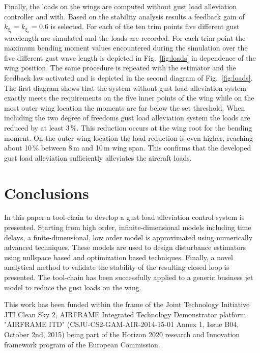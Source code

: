 \documentclass[graybox]{svmult}
\begin{document}
Finally, the loads on the wings are computed without gust load alleviation controller and with.  Based on the stability analysis results a feedback gain of $k_{\xi_i}=k_{\xi_o}=0.6$ is selected. For each of the ten trim points five different gust wavelength are simulated and the loads are recorded. For each trim point the maximum bending moment values  encountered during the simulation over the five different gust wave length is depicted in Fig.~\ref{fig:loads} in dependence of the wing position. The same procedure is repeated with the estimator and the feedback law activated and is depicted in the second diagram of Fig.~\ref{fig:loads}. The first diagram shows that the system without gust load alleviation system exactly meets the requirements on the five inner  points of the wing while on the most outer wing location the moments are far below the set threshold. When including the two degree of freedoms gust load alleviation system the loads are reduced by at least 3\,\%. This reduction occurs at the wing root for the bending moment. On the outer wing location the load reduction is even higher, reaching about 10\,\% between 8\,m and 10\,m wing span.
This confirms that the developed gust load alleviation sufficiently alleviates the aircraft loads.\vspace{-1mm}

\section{Conclusions}\vspace{-1mm}
In this paper a tool-chain to develop a gust load alleviation control system is presented. Starting from high order, infinite-dimensional models including time delays, a finite-dimensional, low order model is approximated using numerically advanced techniques. These models are used to design  disturbance estimators using nullspace based and optimization based techniques. Finally, a novel analytical method to validate the stability of the resulting closed loop is presented. The tool-chain has been successfully applied to a generic business jet model to reduce the gust loads on the wing. 

\vspace{-2mm}
\begin{acknowledgement}
This work has been funded within the frame of the Joint Technology Initiative JTI Clean Sky 2, AIRFRAME Integrated Technology Demonstrator platform "AIRFRAME ITD" (CSJU-CS2-GAM-AIR-2014-15-01 Annex 1, Issue B04, October 2nd, 2015) being part of the Horizon 2020 research and Innovation framework program of the European Commission.
\end{acknowledgement}
%

\vspace{-6mm}



%
\end{document}

